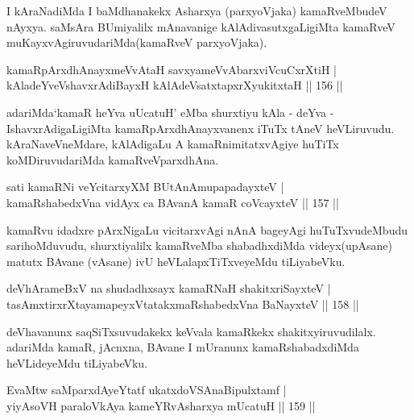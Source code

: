 \begin{artha}
I kAraNadiMda I baMdhanakekx Asharxya (parxyoVjaka) kamaRveMbudeV nAyxya. saMsAra BUmiyalilx mAnavanige kAlAdivasutxgaLigiMta kamaRveV muKayxvAgiruvudariMda(kamaRveV parxyoVjaka).
\end{artha}

\begin{shl}
kamaRpArxdhAnayxmeVvAtaH savxyameVvAbarxviVcuCxrXtiH |\\
kAladeYveVshavxrAdiBayxH kAlAdeVsatxtapxrXyukitxtaH \hfill || 156 ||
\end{shl}

\begin{artha}
adariMda`kamaR heYva uUcatuH' eMba shurxtiyu  kAla - deYva - IshavxrAdigaLigiMta kamaRpArxdhAnayxvanenx iTuTx tAneV heVLiruvudu. kAraNaveVneMdare, kAlAdigaLu A kamaRnimitatxvAgiye huTiTx koMDiruvudariMda kamaRveVparxdhAna.
\end{artha}


\begin{shl}
sati kamaRNi veYcitarxyXM BUtAnAmupapadayxteV |\\
kamaRshabedxVna vidAyx ca BAvanA kamaR coVcayxteV \hfill || 157 ||
\end{shl}

\begin{artha}
kamaRvu idadxre pArxNigaLu vicitarxvAgi nAnA bageyAgi huTuTxvudeMbudu sarihoMduvudu, shurxtiyalilx kamaRveMba shabadhxdiMda videyx(upAsane) matutx BAvane (vAsane) ivU heVLalapxTiTxveyeMdu tiLiyabeVku.
\end{artha}


\begin{shl}
deVhArameBxV na shudadhxsayx kamaRNaH shakitxriSayxteV |\\
tasAmxtirxrXtayamapeyxVtatakxmaRshabedxVna BaNayxteV \hfill || 158 ||
\end{shl}

\begin{artha}
deVhavanunx saqSiTxsuvudakekx keVvala kamaRkekx shakitxyiruvudilalx. adariMda kamaR, jAcnxna, BAvane I mUranunx kamaRshabadxdiMda heVLideyeMdu tiLiyabeVku.
\end{artha}

\begin{shl}
EvaMtw saMparxdAyeYtatf ukatxdoVSAnaBipulxtamf  | \\
 yiyAsoVH paraloVkAya kameYRvAsharxya mUcatuH \hfill|| 159 ||
\end{shl}


